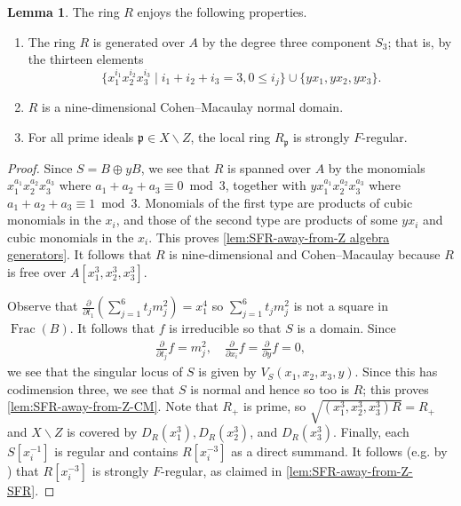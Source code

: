 \documentclass[reqno,11pt]{amsart}
\numberwithin{equation}{section}
\theoremstyle{definition}
\theoremstyle{definition}
\newtheorem{lemma}[theorem]{Lemma}
\theoremstyle{definition}
\theoremstyle{remark}
\newcommand{\Frac}{\operatorname{Frac}}
\newcommand{\fp}{\mathfrak{p}}
\begin{document}
\begin{lemma}The ring $R$ enjoys the following properties.\label{lem:SFR-away-from-Z}
    \begin{enumerate}[label=(\alph*)]
        \item\label{lem:SFR-away-from-Z algebra generators} The ring $R$ is generated over $A$ by the degree three component $S_3$; that is, by the thirteen elements
        \begin{equation}
            \{x_1^{i_1}x_2^{i_2}x_3^{i_3}\mid i_1+i_2+i_3=3, 0\leq i_j\}\cup \{yx_1,yx_2,yx_3\}.\label{eq:A-algebra-gens}
        \end{equation}
        \item\label{lem:SFR-away-from-Z 9-dimensional} $R$ is a nine-dimensional Cohen--Macaulay normal domain.\label{lem:SFR-away-from-Z-CM}
        \item\label{lem:SFR-away-from-Z SFR away from Z} For all prime ideals $\fp\in X\smallsetminus Z$, the local ring $R_\fp$ is strongly $F$-regular.\label{lem:SFR-away-from-Z-SFR}
    \end{enumerate}
\end{lemma}
\begin{proof}
    Since $S=B\oplus yB$, we see that $R$ is spanned over $A$ by the monomials $x_1^{a_1}x_2^{a_2}x_3^{a_3}$ where $a_1+a_2+a_3\equiv 0\bmod 3$, together with $yx_1^{a_1}x_2^{a_2}x_3^{a_3}$ where $a_1+a_2+a_3\equiv 1\bmod 3$. Monomials of the first type are products of cubic monomials in the $x_i$, and those of the second type are products of some $yx_i$ and cubic monomials in the $x_i$. This proves \ref{lem:SFR-away-from-Z algebra generators}. It follows that $R$ is nine-dimensional and Cohen--Macaulay because $R$ is free over $A[x_1^3,x_2^3,x_3^3]$.

    Observe that $\frac{\partial}{\partial t_1}\left(\sum\limits_{j=1}^6 t_j m_j^2\right)=x_1^4$ so $\sum\limits_{j=1}^6 t_j m_j^2$ is not a square in $\Frac(B)$. It follows that $f$ is irreducible so that $S$ is a domain. Since 
    \begin{align*}
        \frac{\partial}{\partial t_j}f=m_j^2, \quad \frac{\partial}{\partial x_i}f=\frac{\partial}{\partial y}f=0,
    \end{align*}
    we see that the singular locus of $S$ is given by $V_S(x_1,x_2,x_3,y)$. Since this has codimension three, we see that $S$ is normal and hence so too is $R$; this proves \ref{lem:SFR-away-from-Z-CM}. Note that $R_+$ is prime, so $\sqrt{(x_1^3,x_2^3,x_3^3)R}=R_+$ and $X\smallsetminus Z$ is covered by $D_R(x_1^3), D_R(x_2^3)$, and $D_R(x_3^3)$. Finally, each $S[x_i^{-1}]$ is regular and contains $R[x_i^{-3}]$ as a direct summand. It follows (e.g. by \cite[Theorem 3.9]{MP25}) that $R[x_i^{-3}]$ is strongly $F$-regular, as claimed in \ref{lem:SFR-away-from-Z-SFR}.
\end{proof}
\end{document}
